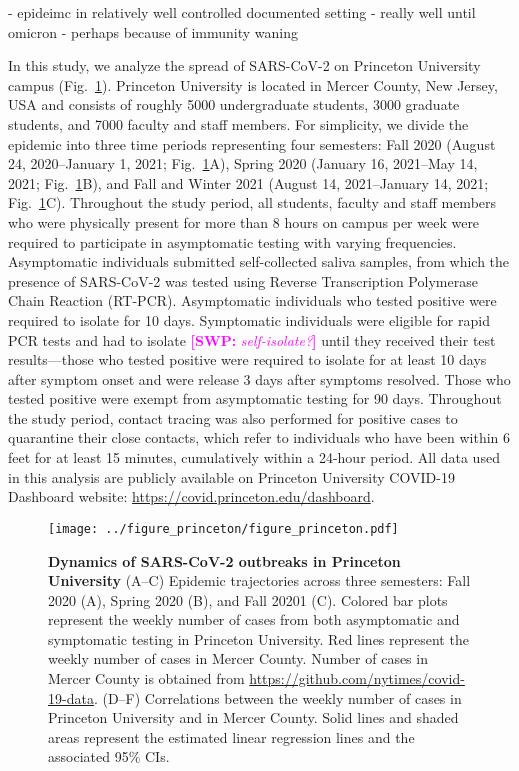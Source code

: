 \documentclass[12pt]{article}
\newcommand{\fref}[1]{Fig.~\ref{fig:#1}}
\newcommand{\comment}[3]{\textcolor{#1}{\textbf{[#2: }\textsl{#3}\textbf{]}}}
\newcommand{\swp}[1]{\comment{magenta}{SWP}{#1}}
\begin{document}
- epideimc in relatively well controlled documented setting
- really well until omicron
- perhaps because of immunity waning 

In this study, we analyze the spread of SARS-CoV-2 on Princeton University campus (\fref{princeton}).
Princeton University is located in Mercer County, New Jersey, USA and consists of roughly 5000 undergraduate students, 3000 graduate students, and 7000 faculty and staff members.
For simplicity, we divide the epidemic into three time periods representing four semesters: Fall 2020 (August 24, 2020--January 1, 2021; \fref{princeton}A), Spring 2020 (January 16, 2021--May 14, 2021; \fref{princeton}B), and Fall and Winter 2021 (August 14, 2021--January 14, 2021; \fref{princeton}C).
Throughout the study period, all students, faculty and staff members who were physically present for more than 8 hours on campus per week were required to participate in asymptomatic testing with varying frequencies.
Asymptomatic individuals submitted self-collected saliva samples, from which the presence of SARS-CoV-2 was tested using Reverse Transcription Polymerase Chain Reaction (RT-PCR).  
Asymptomatic individuals who tested positive were required to isolate for 10 days.
Symptomatic individuals were eligible for rapid PCR tests and had to isolate \swp{self-isolate?} until they received their test results---those who tested positive were required to isolate for at least 10 days after symptom onset and were release 3 days after symptoms resolved.
Those who tested positive were exempt from asymptomatic testing for 90 days.
Throughout the study period, contact tracing was also performed for positive cases to quarantine their close contacts, which refer to individuals who have been within 6 feet for at least 15 minutes, cumulatively within a 24-hour period.
All data used in this analysis are publicly available on Princeton University COVID-19 Dashboard website: \url{https://covid.princeton.edu/dashboard}.


\begin{figure}[!th]
\texttt{[image: ../figure\_princeton/figure\_princeton.pdf]}
\caption{
\textbf{Dynamics of SARS-CoV-2 outbreaks in Princeton University}
(A--C) Epidemic trajectories across three semesters: Fall 2020 (A), Spring 2020 (B), and Fall 20201 (C).
Colored bar plots represent the weekly number of cases from both asymptomatic and symptomatic testing in Princeton University.
Red lines represent the weekly number of cases in Mercer County.
Number of cases in Mercer County is obtained from \url{https://github.com/nytimes/covid-19-data}.
(D--F) Correlations between the weekly number of cases in Princeton University and in Mercer County.
Solid lines and shaded areas represent the estimated linear regression lines and the associated 95\% CIs.
\label{fig:princeton}
}
\end{figure}
\end{document}
